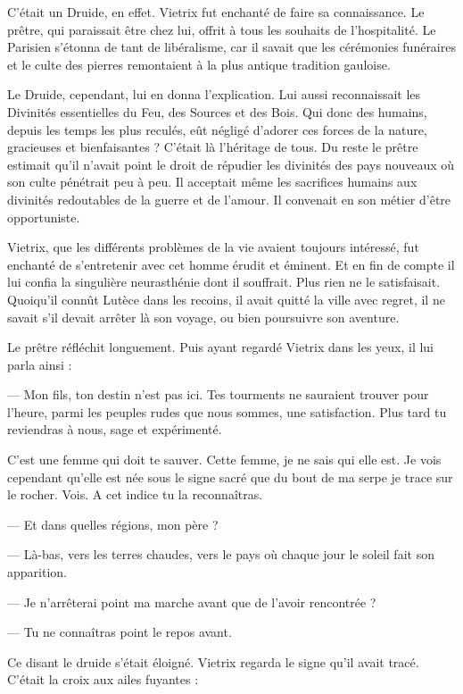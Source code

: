 \documentclass[a4paper, 11pt, oneside, polutonikogreek, french]{article}
\begin{document}
C'était un Druide, en effet. Vietrix fut enchanté de faire sa connaissance. Le prêtre, qui paraissait être chez lui, offrit à tous les souhaits de l'hospitalité. Le Parisien s'étonna de tant de libéralisme, car il savait que les cérémonies funéraires et le culte des pierres remontaient à la plus antique tradition gauloise.

Le Druide, cependant, lui en donna l'explication. Lui aussi reconnaissait les Divinités essentielles du Feu, des Sources et des Bois. Qui donc des humains, depuis les temps les plus reculés, eût négligé d'adorer ces forces de la nature, gracieuses et bienfaisantes ? C'était là l'héritage de tous. Du reste le prêtre estimait qu'il n'avait point le droit de répudier les divinités des pays nouveaux où son culte pénétrait peu à peu. Il acceptait même les sacrifices humains aux divinités redoutables de la guerre et de l'amour. Il convenait en son métier d'être opportuniste.

Vietrix, que les différents problèmes de la vie avaient toujours intéressé, fut enchanté de s'entretenir avec cet homme érudit et éminent. Et en fin de compte il lui confia la singulière neurasthénie dont il souffrait. Plus rien ne le satisfaisait. Quoiqu'il connût Lutèce dans les recoins, il avait quitté la ville avec regret, il ne savait s'il devait arrêter là son voyage, ou bien poursuivre son aventure.

Le prêtre réfléchit longuement. Puis ayant regardé Vietrix dans les yeux, il lui parla ainsi :

--- Mon fils, ton destin n'est pas ici. Tes tourments ne sauraient trouver pour l'heure, parmi les peuples rudes que nous sommes, une satisfaction. Plus tard tu reviendras à nous, sage et expérimenté.

C'est une femme qui doit te sauver. Cette femme, je ne sais qui elle est. Je vois cependant qu'elle est née sous le signe sacré que du bout de ma serpe je trace sur le rocher. Vois. A cet indice tu la reconnaîtras.

--- Et dans quelles régions, mon père ?

--- Là-bas, vers les terres chaudes, vers le pays où chaque jour le soleil fait son apparition.

--- Je n'arrêterai point ma marche avant que de l'avoir rencontrée ?

--- Tu ne connaîtras point le repos avant.

Ce disant le druide s'était éloigné. Vietrix regarda le signe qu'il avait tracé. C'était la croix aux ailes fuyantes :
\end{document}
